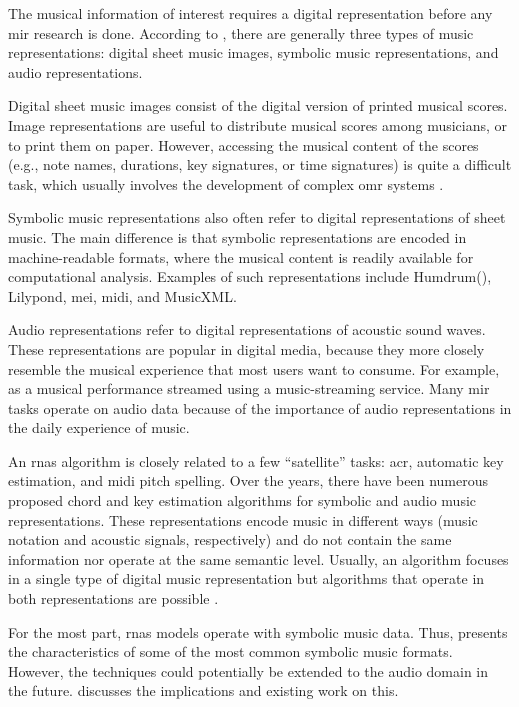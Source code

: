 


The musical information of interest requires a digital
representation before any \gls{mir} research is done.
According to \textcite{muller2015music}, there are generally
three types of music representations: digital sheet music
images, symbolic music representations, and audio
representations.

Digital sheet music images consist of the digital version of
printed musical scores. Image representations are useful to
distribute musical scores among musicians, or to print them
on paper. However, accessing the musical content of the
scores (e.g., note names, durations, key signatures, or time
signatures) is quite a difficult task, which usually
involves the development of complex \gls{omr} systems
\parencite{calvozaragoza2020understanding}.

Symbolic music representations also often refer to digital
representations of sheet music. The main difference is that
symbolic representations are encoded in machine-readable
formats, where the musical content is readily available for
computational analysis. Examples of such representations
include Humdrum(), Lilypond, \gls{mei},
\gls{midi}, and MusicXML.

Audio representations refer to digital representations of
acoustic sound waves. These representations are popular in
digital media, because they more closely resemble the
musical experience that most users want to consume. For
example, as a musical performance streamed using a
music-streaming service. Many \gls{mir} tasks operate on
audio data because of the importance of audio
representations in the daily experience of music.

An \glspl{rna} algorithm is closely
related to a few ``satellite'' tasks: \gls{acr}, automatic
key estimation, and \gls{midi} pitch spelling. Over the
years, there have been numerous proposed chord and key
estimation algorithms for symbolic and audio music
representations. These representations encode music in
different ways (music notation and acoustic signals,
respectively) and do not contain the same information nor
operate at the same semantic level. Usually, an algorithm
focuses in a single type of digital music representation but
algorithms that operate in both representations are possible
\parencite{napoleslopez2019keyfinding}.

For the most part, \glspl{rna} models
operate with symbolic music data. Thus,
 presents the
characteristics of some of the most common symbolic music
formats. However, the techniques could potentially be
extended to the audio domain in the future.
 discusses the
implications and existing work on this.
